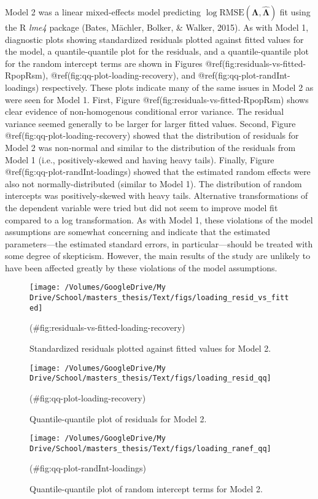 \begin{appendix}
Model 2 was a linear mixed-effects model predicting
\(\log \textrm{RMSE}(\mathbf{\Lambda}, \hat{\mathbf{\Lambda}})\) fit
using the R \emph{lme4} package (Bates, Mächler, Bolker, \& Walker,
2015). As with Model 1, diagnostic plots showing standardized residuals
plotted against fitted values for the model, a quantile-quantile plot
for the residuals, and a quantile-quantile plot for the random intercept
terms are shown in Figures @ref(fig:residuals-vs-fitted-RpopRsm),
@ref(fig:qq-plot-loading-recovery), and
@ref(fig:qq-plot-randInt-loadings) respectively. These plots indicate
many of the same issues in Model 2 as were seen for Model 1. First,
Figure @ref(fig:residuals-vs-fitted-RpopRsm) shows clear evidence of
non-homogenous conditional error variance. The residual variance seemed
generally to be larger for larger fitted values. Second, Figure
@ref(fig:qq-plot-loading-recovery) showed that the distribution of
residuals for Model 2 was non-normal and similar to the distribution of
the residuals from Model 1 (i.e., positively-skewed and having heavy
tails). Finally, Figure @ref(fig:qq-plot-randInt-loadings) showed that
the estimated random effects were also not normally-distributed (similar
to Model 1). The distribution of random intercepts was positively-skewed
with heavy tails. Alternative transformations of the dependent variable
were tried but did not seem to improve model fit compared to a log
transformation. As with Model 1, these violations of the model
assumptions are somewhat concerning and indicate that the estimated
parameters---the estimated standard errors, in particular---should be
treated with some degree of skepticism. However, the main results of the
study are unlikely to have been affected greatly by these violations of
the model assumptions.

\begin{figure}

{\centering \texttt{[image: /Volumes/GoogleDrive/My Drive/School/masters\_thesis/Text/figs/loading\_resid\_vs\_fitted]} 

}

\caption{Standardized residuals plotted against fitted values for Model 2.}(\#fig:residuals-vs-fitted-loading-recovery)
\end{figure}

\begin{figure}

{\centering \texttt{[image: /Volumes/GoogleDrive/My Drive/School/masters\_thesis/Text/figs/loading\_resid\_qq]} 

}

\caption{Quantile-quantile plot of residuals for Model 2.}(\#fig:qq-plot-loading-recovery)
\end{figure}

\begin{figure}

{\centering \texttt{[image: /Volumes/GoogleDrive/My Drive/School/masters\_thesis/Text/figs/loading\_ranef\_qq]} 

}

\caption{Quantile-quantile plot of random intercept terms for Model 2.}(\#fig:qq-plot-randInt-loadings)
\end{figure}
\end{appendix}
